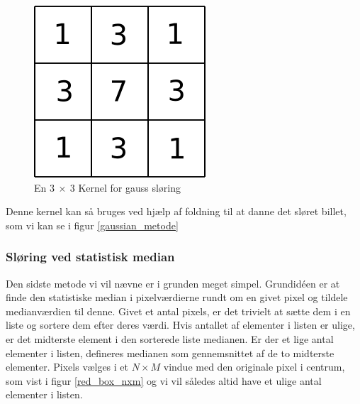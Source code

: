 {\begin{figure}[h]
	\begin{center}
		\includegraphics[scale=0.5,angle=0]{afsnit/vores_implementation/billeder/sloering/gauss}
	\end{center}
	\caption[]{En $3~\times{}~3$ Kernel for gauss sløring}
	\label{gauss}
\end{figure}

Denne kernel kan så bruges ved hjælp af foldning til at danne det sløret
billet, som vi kan se i figur \ref{gaussian_metode}

\subsubsection*{Sløring ved statistisk median}
Den sidste metode vi vil nævne er i grunden meget simpel. Grundidéen er
at finde den statistiske median i pixelværdierne rundt om en givet pixel
og tildele medianværdien til denne. Givet et antal pixels, er det
trivielt at sætte dem i en liste og sortere dem efter deres værdi. Hvis
antallet af elementer i listen er ulige, er det midterste element i den
sorterede liste medianen. Er der et lige antal elementer i listen,
defineres medianen som gennemsnittet af de to midterste elementer.
Pixels vælges i et $N \times M$ vindue med den originale pixel i
centrum, som vist i figur \ref{red_box_nxm} og vi vil således altid have
et ulige antal elementer i listen.

}
